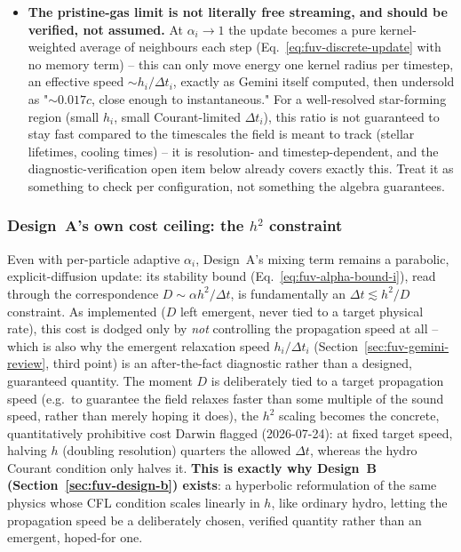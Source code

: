 \begin{itemize}
    is itself a diffusion process -- was already the honest version of
    this argument and needs no revision. (Design~B below \emph{does}
    derive a genuine Eddington-closure system properly, from the actual
    moment equations, with its regime of validity stated explicitly --
    resolving this exact critique rather than repeating Gemini's
    mistake.)
  \item \textbf{The pristine-gas limit is not literally free streaming,
    and should be verified, not assumed.} At $\alpha_i\to1$ the update
    becomes a pure kernel-weighted average of neighbours each step
    (Eq.~\ref{eq:fuv-discrete-update} with no memory term) -- this can
    only move energy one kernel radius per timestep, an effective speed
    $\sim h_i/\Delta t_i$, exactly as Gemini itself computed, then
    undersold as "$\sim0.017c$, close enough to instantaneous." For a
    well-resolved star-forming region (small $h_i$, small
    Courant-limited $\Delta t_i$), this ratio is not guaranteed to stay
    fast compared to the timescales the field is meant to track (stellar
    lifetimes, cooling times) -- it is resolution- and
    timestep-dependent, and the diagnostic-verification open item below
    already covers exactly this. Treat it as something to check per
    configuration, not something the algebra guarantees.
\end{itemize}

\subsubsection{Design~A's own cost ceiling: the $h^2$ constraint}
\label{sec:fuv-design-a-limit}

Even with per-particle adaptive $\alpha_i$, Design~A's mixing term
remains a parabolic, explicit-diffusion update: its stability bound
(Eq.~\ref{eq:fuv-alpha-bound-i}), read through the correspondence
$D\sim\alpha h^2/\Delta t$, is fundamentally an
$\Delta t\lesssim h^2/D$ constraint. As implemented ($D$ left emergent,
never tied to a target physical rate), this cost is dodged only by
\emph{not} controlling the propagation speed at all -- which is also
why the emergent relaxation speed $h_i/\Delta t_i$
(Section~\ref{sec:fuv-gemini-review}, third point) is an
after-the-fact diagnostic rather than a designed, guaranteed quantity.
The moment $D$ is deliberately tied to a target propagation speed (e.g.\
to guarantee the field relaxes faster than some multiple of the sound
speed, rather than merely hoping it does), the $h^2$ scaling becomes the
concrete, quantitatively prohibitive cost Darwin flagged
(2026-07-24): at fixed target speed, halving $h$ (doubling resolution)
quarters the allowed $\Delta t$, whereas the hydro Courant condition
only halves it. \textbf{This is exactly why Design~B
(Section~\ref{sec:fuv-design-b}) exists}: a hyperbolic reformulation of
the same physics whose CFL condition scales linearly in $h$, like
ordinary hydro, letting the propagation speed be a deliberately chosen,
verified quantity rather than an emergent, hoped-for one.

